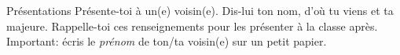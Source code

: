 \begin{frame}{Présentations}
  Présente-toi à un(e) voisin(e).
  Dis-lui ton \alert{nom}, d'\alert{où} tu viens et ta \alert{majeure}.
  Rappelle-toi ces renseignements pour les présenter à la classe après.
  \alert{Important}: écris le \emph{prénom} de ton/ta voisin(e) sur un petit papier.
\end{frame}